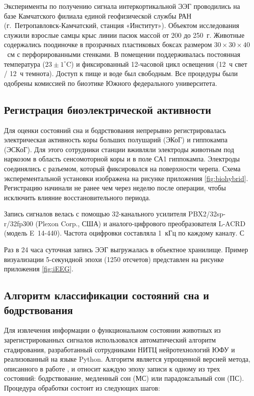 \documentclass[14pt]{mmcs_article}
\begin{document}
Эксперименты по получению сигнала интеркортикальной ЭЭГ проводились на базе Камчатского филиала единой геофизической службы РАН (г.~Петропавловск-Камчатский, станция «Институт»). Объектом исследования служили взрослые самцы крыс линии пасюк массой от 200 до 250~г. Животные содержались поодиночке в прозрачных пластиковых боксах размером $30 \times 30 \times 40$~см с перфорированными стенками. В помещении поддерживалась постоянная температура ($23 \pm 1^{\circ}$C) и фиксированный 12-часовой цикл освещения (12~ч свет / 12~ч темнота). Доступ к пище и воде был свободным. Все процедуры были одобрены комиссией по биоэтике Южного федерального университета.

\subsection*{Регистрация биоэлектрической активности}

Для оценки состояний сна и бодрствования непрерывно регистрировалась электрическая активность коры больших полушарий (ЭКоГ) и гиппокампа (ЭСКоГ). Для этого сотрудники станции  вживляли электроды животным под наркозом в область сенсомоторной коры и в поле СА1 гиппокампа. Электроды соединялись с разъемом, который фиксировался на поверхности черепа. Схема эксперементальной установки изображена на рисунке приложения \ref{fig:biohybrid}. Регистрацию начинали не ранее чем через неделю после операции, чтобы исключить влияние восстановительного периода.

Запись сигналов велась с помощью 32-канального усилителя PBX2/32sp-r/32fp300 (Plexon Corp., США) и аналого-цифрового преобразователя L-ACRD (модель E~14-440). Частота оцифровки составляла 1~кГц по каждому каналу. С

Раз в 24 часа суточная запись ЭЭГ выгружалась в объектное хранилище. Пример визуализации 5-секундной эпохи (1250 отсчетов) представлен на рисунке приложения \ref{fig:iEEG}.

\subsection*{Алгоритм классификации состояний сна и бодрствования}

Для извлечения информации о функциональном состоянии животных из зарегистрированных сигналов использовался автоматический алгоритм стадирования, разработанный сотрудниками НИТЦ нейротехнологий ЮФУ и реализованный на языке Python. Алгоритм является упрощенной версией метода, описанного в работе \cite{Saevskiy2025}, и относит каждую эпоху записи к одному из трех состояний: бодрствование, медленный сон (МС) или парадоксальный сон (ПС). Процедура обработки состоит из следующих шагов:
\end{document}
